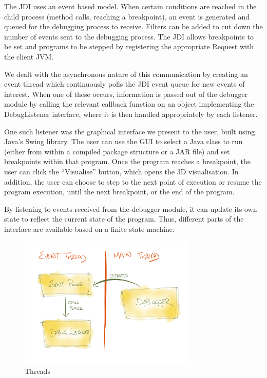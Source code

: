\documentclass[11pt, a4paper]{report}
\begin{document}
The JDI uses an event based model. When certain conditions are reached in the child process (method calls, reaching a breakpoint), an event is generated and queued for the debugging process to receive. Filters can be added to cut down the number of events sent to the debugging process. The JDI allows breakpoints to be set and programs to be stepped by registering the appropriate Request with the client JVM.

We dealt with the asynchronous nature of this communication by creating an event thread which continuously polls the JDI event queue for new events of interest. When one of these occurs, information is passed out of the debugger module by calling the relevant callback function on an object implementing the DebugListener interface, where it is then handled appropriately by each listener.

One such listener was the graphical interface we present to the user, built using Java’s Swing library. The user can use the GUI to select a Java class to run (either from within a compiled package structure or a JAR file) and set breakpoints within that program. Once the program reaches a breakpoint, the user can click the “Visualise” button, which opens the 3D visualisation. In addition, the user can choose to step to the next point of execution or resume the program execution, until the next breakpoint, or the end of the program.

By listening to events received from the debugger module, it can update its own state to reflect the current state of the program. Thus, different parts of the interface are available based on a finite state machine.

\begin{figure}[h]
        \centering
        \includegraphics[width=0.75\textwidth]{images/final/thread.png}
        \caption{Threads}
\end{figure}
\end{document}
